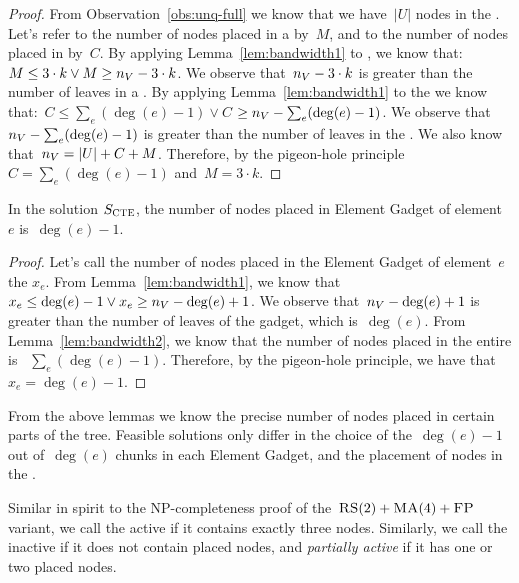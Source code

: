 \begin{proof}
  From Observation~\ref{obs:unq-full} we know that we have~$|U|$ nodes
  in the {\UnqSubtree}. Let's refer to the number of nodes placed in
  a {\MatchSubtree} by~$M$, and to the number of nodes placed in
  {\CoverSubtree} by~$C$. By applying Lemma~\ref{lem:bandwidth1} to
  {\MatchSubtree}, we know that: $ M \leq 3\cdot k \vee M \geq n_V - 3\cdot k$.
  We observe that~$n_V - 3\cdot k$ is greater than the number of
  leaves in a {\MatchSubtree}.  By applying Lemma~\ref{lem:bandwidth1}
  to the {\CoverSubtree} we know that:~$ C \leq \sum_e(\deg(e)-1) \vee C$ $\geq n_V - \sum_e(\deg(e)-1)$.
  We observe that~$n_V - \sum_e(\deg(e)-1)$ is greater than the number
  of leaves in the {\CoverSubtree}.
  We also know that~$n_V = |U| + C + M$. Therefore, by the pigeon-hole principle
 ~$C = \sum_e(\deg(e)-1)$ and~$M = 3\cdot k$.
\end{proof}


\begin{lemma}
  In the solution $S_{\mathrm{\textsc{CTE}}}$, the number of nodes placed in Element Gadget of
  element~$e$ is~$\deg(e)-1$.
  \label{lem:bandwidth3}
\end{lemma}

\begin{proof}
  Let's call the number of nodes placed in the Element Gadget of
  element~$e$ the $x_e$.  From Lemma~\ref{lem:bandwidth1}, we know that
 ~$x_e \leq \deg(e) - 1 \vee x_e \geq n_V - \deg(e) + 1$. We observe
  that~$n_V - \deg(e) + 1$ is greater than the number of leaves of the
  gadget, which is~$\deg(e)$.  From Lemma~\ref{lem:bandwidth2}, we know
  that the number of nodes placed in the entire {\CoverSubtree} is
 ~$\sum_e (\deg(e)-1)$. Therefore, by the pigeon-hole principle, we have
  that~$x_e = \deg(e)-1$.
\end{proof}

From the above lemmas we know the precise number of nodes placed in
certain parts of the tree. Feasible solutions only differ in 
the choice of the~$\deg(e) - 1$ out of~$\deg(e)$ chunks
in each Element Gadget, and the placement of nodes in the
{\MatchSubtree}.



Similar in spirit to the NP-completeness proof of the~$\textsc{RS}(2)+\textsc{MA}(4)+\textsc{FP}$ variant,
we call the {\TripleGadget} active if it contains exactly three nodes. 
Similarly, we call the {\TripleGadget} inactive if it
does not contain placed nodes, and \emph{partially active} if it
has one or two
placed nodes.


